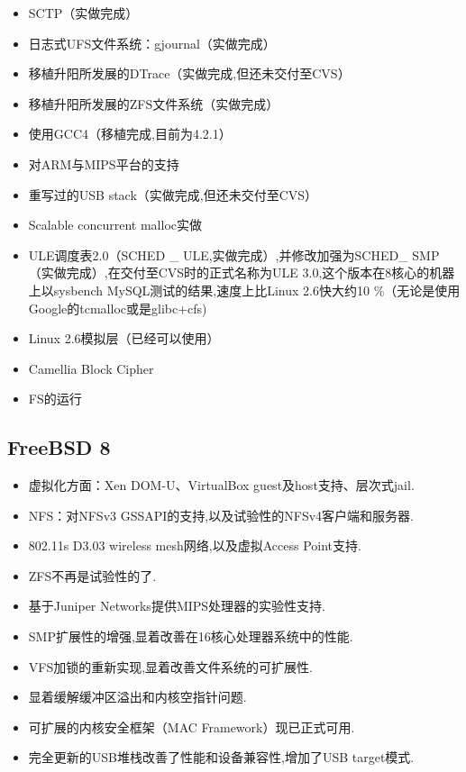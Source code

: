\documentclass[a4paper,12pt,notitlepage]{article}
\begin{document}
\begin{itemize}
    \item SCTP（实做完成）
    \item 日志式UFS文件系统：gjournal（实做完成）
    \item 移植升阳所发展的DTrace（实做完成,但还未交付至CVS）
    \item 移植升阳所发展的ZFS文件系统（实做完成）
    \item 使用GCC4（移植完成,目前为4.2.1）
    \item 对ARM与MIPS平台的支持
    \item 重写过的USB stack（实做完成,但还未交付至CVS）
    \item Scalable concurrent malloc实做
    \item ULE调度表2.0（SCHED \_ ULE,实做完成）,并修改加强为SCHED\_ SMP（实做完成）,在交付至CVS时的正式名称为ULE 3.0,这个版本在8核心的机器上以sysbench MySQL测试的结果,速度上比Linux 2.6快大约10 \%（无论是使用Google的tcmalloc或是glibc+cfs)
    \item Linux 2.6模拟层（已经可以使用）
    \item Camellia Block Cipher
    \item FS的运行
\end{itemize}

\subsection{FreeBSD 8}

\begin{itemize}
    \item 虚拟化方面：Xen DOM-U、VirtualBox guest及host支持、层次式jail.
    \item NFS：对NFSv3 GSSAPI的支持,以及试验性的NFSv4客户端和服务器.
    \item 802.11s D3.03 wireless mesh网络,以及虚拟Access Point支持.
    \item ZFS不再是试验性的了.
    \item 基于Juniper Networks提供MIPS处理器的实验性支持.
    \item SMP扩展性的增强,显着改善在16核心处理器系统中的性能.
    \item VFS加锁的重新实现,显着改善文件系统的可扩展性.
    \item 显着缓解缓冲区溢出和内核空指针问题.
    \item 可扩展的内核安全框架（MAC Framework）现已正式可用.
    \item 完全更新的USB堆栈改善了性能和设备兼容性,增加了USB target模式.
\end{itemize}
\end{document}
